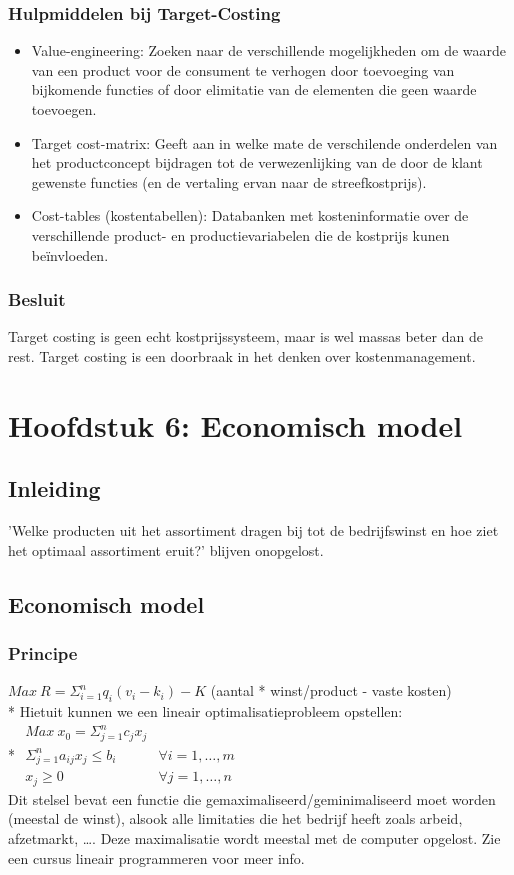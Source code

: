 \documentclass[12pt]{article}
\begin{document}
\subsubsection{Hulpmiddelen bij Target-Costing}
\begin{itemize}
\item Value-engineering: Zoeken naar de verschillende mogelijkheden om de waarde van een product voor de consument te verhogen door toevoeging van bijkomende functies of door elimitatie van de elementen die geen waarde toevoegen.
\item Target cost-matrix: Geeft aan in welke mate de verschilende onderdelen van het productconcept bijdragen tot de verwezenlijking van de door de klant gewenste functies (en de vertaling ervan naar de streefkostprijs).
\item Cost-tables (kostentabellen): Databanken met kosteninformatie over de verschillende product- en productievariabelen die de kostprijs kunen be\"invloeden.
\end{itemize}
\subsubsection{Besluit}
Target costing is geen echt kostprijssysteem, maar is wel massas beter dan de rest. Target costing is een doorbraak in het denken over kostenmanagement.
\clearpage
\section{Hoofdstuk 6: Economisch model}
\subsection{Inleiding}
'Welke producten uit het assortiment dragen bij tot de bedrijfswinst en hoe ziet het optimaal assortiment eruit?' blijven onopgelost.
\subsection{Economisch model}
\subsubsection{Principe}
$Max\ R = \Sigma_{i = 1}^nq_i(v_i-k_i)-K$ (aantal * winst/product - vaste kosten)\\*
Hietuit kunnen we een lineair optimalisatieprobleem opstellen:\\*
$\begin{array}{rcl}
Max\ x_0 = \Sigma_{j=1}^nc_jx_j & \\
\Sigma_{j=1}^n a_{ij}x_j \le b_{i} & \forall i=1, \dots, m\\
x_j \ge 0 & \forall j = 1, \dots, n
\end{array}$\\
Dit stelsel bevat een functie die gemaximaliseerd/geminimaliseerd moet worden (meestal de winst), alsook alle limitaties die het bedrijf heeft zoals arbeid, afzetmarkt, \dots. Deze maximalisatie wordt meestal met de computer opgelost. Zie een cursus lineair programmeren voor meer info.
\end{document}
